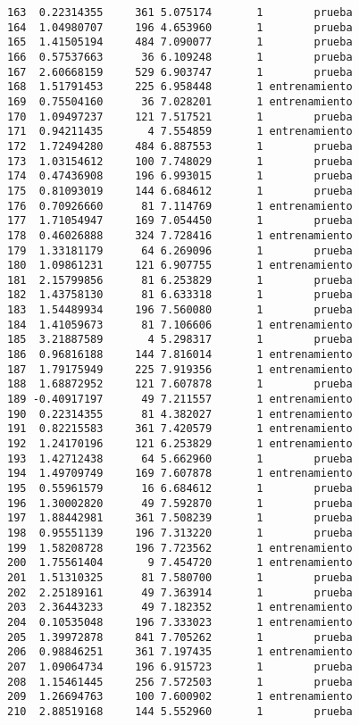 \documentclass[
  letterpaper,
  DIV=11,
  numbers=noendperiod]{scrreprt}
\begin{document}
\begin{verbatim}
163  0.22314355     361 5.075174       1        prueba
164  1.04980707     196 4.653960       1        prueba
165  1.41505194     484 7.090077       1        prueba
166  0.57537663      36 6.109248       1        prueba
167  2.60668159     529 6.903747       1        prueba
168  1.51791453     225 6.958448       1 entrenamiento
169  0.75504160      36 7.028201       1 entrenamiento
170  1.09497237     121 7.517521       1        prueba
171  0.94211435       4 7.554859       1 entrenamiento
172  1.72494280     484 6.887553       1        prueba
173  1.03154612     100 7.748029       1        prueba
174  0.47436908     196 6.993015       1        prueba
175  0.81093019     144 6.684612       1        prueba
176  0.70926660      81 7.114769       1 entrenamiento
177  1.71054947     169 7.054450       1        prueba
178  0.46026888     324 7.728416       1 entrenamiento
179  1.33181179      64 6.269096       1        prueba
180  1.09861231     121 6.907755       1 entrenamiento
181  2.15799856      81 6.253829       1        prueba
182  1.43758130      81 6.633318       1        prueba
183  1.54489934     196 7.560080       1        prueba
184  1.41059673      81 7.106606       1 entrenamiento
185  3.21887589       4 5.298317       1        prueba
186  0.96816188     144 7.816014       1 entrenamiento
187  1.79175949     225 7.919356       1 entrenamiento
188  1.68872952     121 7.607878       1        prueba
189 -0.40917197      49 7.211557       1 entrenamiento
190  0.22314355      81 4.382027       1 entrenamiento
191  0.82215583     361 7.420579       1 entrenamiento
192  1.24170196     121 6.253829       1 entrenamiento
193  1.42712438      64 5.662960       1        prueba
194  1.49709749     169 7.607878       1 entrenamiento
195  0.55961579      16 6.684612       1        prueba
196  1.30002820      49 7.592870       1        prueba
197  1.88442981     361 7.508239       1        prueba
198  0.95551139     196 7.313220       1        prueba
199  1.58208728     196 7.723562       1 entrenamiento
200  1.75561404       9 7.454720       1 entrenamiento
201  1.51310325      81 7.580700       1        prueba
202  2.25189161      49 7.363914       1        prueba
203  2.36443233      49 7.182352       1 entrenamiento
204  0.10535048     196 7.333023       1 entrenamiento
205  1.39972878     841 7.705262       1        prueba
206  0.98846251     361 7.197435       1 entrenamiento
207  1.09064734     196 6.915723       1        prueba
208  1.15461445     256 7.572503       1        prueba
209  1.26694763     100 7.600902       1 entrenamiento
210  2.88519168     144 5.552960       1        prueba

\end{verbatim}
\end{document}
